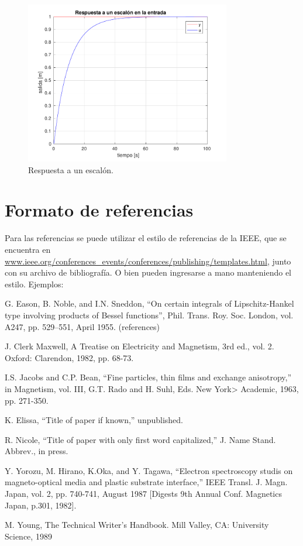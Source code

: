 \documentclass[10pt]{article}
\begin{document}
\begin{figure}
\centering
\includegraphics[width=0.8\textwidth]{img/respescalon}
\caption{Respuesta a un escalón.}
\label{fig:respescalon}
\end{figure}

\section{Formato de referencias}
\label{sec:referencias}
Para las referencias se puede utilizar el estilo de referencias de la IEEE, que
se encuentra en\\
\url{www.ieee.org/conferences_events/conferences/publishing/templates.html},
junto con su archivo de bibliografía. O bien pueden ingresarse a mano
manteniendo el estilo. Ejemplos:

\begin{enumerate}[{[}1{]}]
  \item G. Eason, B. Noble, and I.N. Sneddon, ``On certain integrals of
Lipschitz-Hankel type involving products of Bessel functions'', Phil. Trans.
Roy. Soc. London, vol. A247, pp. 529--551, April 1955. (references)
  \item J. Clerk Maxwell, A Treatise on Electricity and Magnetism, 3rd ed.,
vol. 2. Oxford: Clarendon, 1982, pp. 68-73.
  \item I.S. Jacobs and C.P. Bean, ``Fine particles, thin films and exchange
anisotropy,'' in Magnetism, vol. III, G.T. Rado and H. Suhl, Eds. New York>
Academic, 1963, pp. 271-350.
  \item K. Elissa, ``Title of paper if known,'' unpublished.
  \item R. Nicole, ``Title of paper with only first word capitalized,'' J. Name
Stand. Abbrev., in press.
  \item Y. Yorozu, M. Hirano, K.Oka, and Y. Tagawa, ``Electron spectroscopy
studis on magneto-optical media and plastic substrate interface,'' IEEE Transl.
J. Magn. Japan, vol. 2, pp. 740-741, August 1987 [Digests 9th Annual Conf.
Magnetics Japan, p.301, 1982].
  \item M. Young, The Technical Writer's Handbook. Mill Valley, CA: University
Science, 1989
\end{enumerate}
\end{document}
